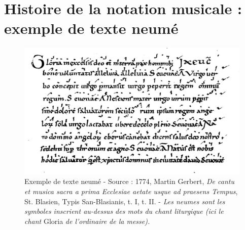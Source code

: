 
\section{Histoire de la notation musicale : exemple de texte neumé}
\label{sec:exempleTexteNeume}
\begin{figure}[!htbp]
	\centering
	\includegraphics[keepaspectratio=true, width=\textwidth]{Annexes/i/neumes.jpg}
	\caption{Exemple de texte neumé - Source : 1774, Martin Gerbert, \textit{De cantu et musica sacra a prima Ecclesiae aetate usque ad praesens Tempus}, St. Blasien, Typis San-Blasianis, t. I, t. II. - \textit{Les neumes sont les symboles inscrient au-dessus des mots du chant liturgique (ici le chant} Gloria \textit{de l'ordinaire de la messe).} }
	\label{fig:neumes}
\end{figure}
\clearpage

